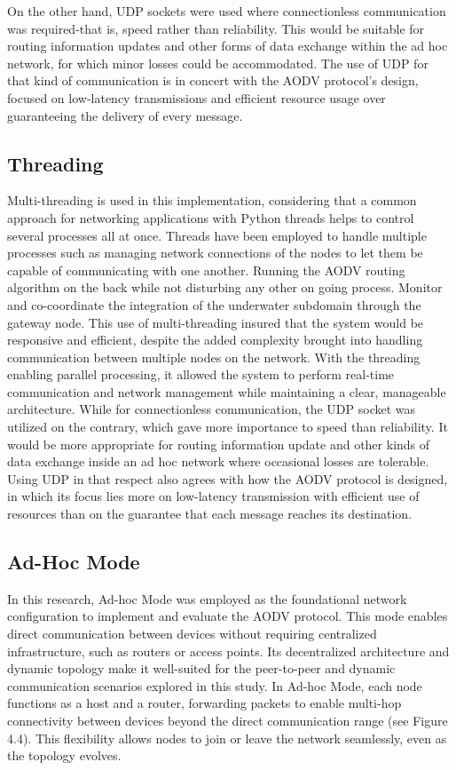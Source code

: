 \documentclass[]{nsm-thesis}
\begin{document}
On the other hand, UDP sockets were used where connectionless communication was required-that is, speed rather than reliability. This would be suitable for routing information updates and other forms of data exchange within the ad hoc network, for which minor losses could be accommodated. The use of UDP for that kind of communication is in concert with the AODV protocol's design, focused on low-latency transmissions and efficient resource usage over guaranteeing the delivery of every message.


\subsection{Threading}
Multi-threading is used in this implementation, considering that a common approach for networking applications with Python threads helps to control several processes all at once. Threads have been employed to handle multiple processes such as managing network connections of the nodes to let them be capable of communicating with one another. Running the AODV routing algorithm on the back while not disturbing any other on going process. Monitor and co-coordinate the integration of the underwater subdomain through the gateway node.
This use of multi-threading insured that the system would be responsive and efficient, despite the added complexity brought into handling communication between multiple nodes on the network. With the threading enabling parallel processing, it allowed the system to perform real-time communication and network management while maintaining a clear, manageable architecture.
While for connectionless communication, the UDP socket was utilized on the contrary, which gave more importance to speed than reliability. It would be more appropriate for routing information update and other kinds of data exchange inside an ad hoc network where occasional losses are tolerable. Using UDP in that respect also agrees with how the AODV protocol is designed, in which its focus lies more on low-latency transmission with efficient use of resources than on the guarantee that each message reaches its destination.
\subsection{Ad-Hoc Mode}
In this research, Ad-hoc Mode was employed as the foundational network configuration to implement and evaluate the AODV protocol. This mode enables direct communication between devices without requiring centralized infrastructure, such as routers or access points. Its decentralized architecture and dynamic topology make it well-suited for the peer-to-peer and dynamic communication scenarios explored in this study. In Ad-hoc Mode, each node functions as a host and a router, forwarding packets to enable multi-hop connectivity between devices beyond the direct communication range (see Figure 4.4). This flexibility allows nodes to join or leave the network seamlessly, even as the topology evolves.
\end{document}

